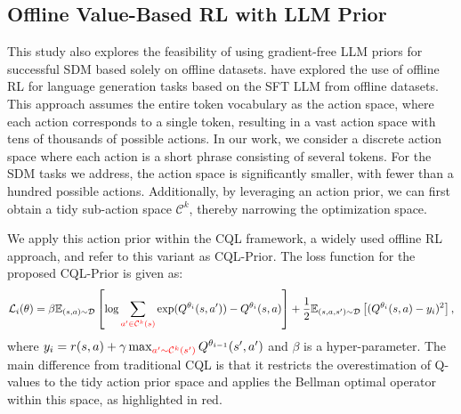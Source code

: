 \documentclass{article} %
\theoremstyle{plain}
\theoremstyle{definition}
\theoremstyle{remark}
\begin{document}
{\subsection{Offline Value-Based RL with LLM Prior}
\label{sec: offline_value_rl}

This study also explores the feasibility of using gradient-free LLM priors for successful SDM based solely on offline datasets.
\citep{snelloffline} have explored the use of offline RL for language generation tasks based on the SFT LLM from offline datasets. This approach assumes the entire token vocabulary as the action space, where each action corresponds to a single token, resulting in a vast action space with tens of thousands of possible actions. In our work, we consider a discrete action space where each action is a short phrase consisting of several tokens. For the SDM tasks we address, the action space is significantly smaller, with fewer than a hundred possible actions. Additionally, by leveraging an action prior, we can first obtain a tidy sub-action space $\mathcal{C}^k$, thereby narrowing the optimization space. 

We apply this action prior within the CQL framework, a widely used offline RL approach, and refer to this variant as CQL-Prior. The loss function for the proposed CQL-Prior is given as:
\begin{equation}
\label{cql_loss}
\mathcal{L}_i(\theta)=\beta\mathbb{E}_{(s,a)\sim \mathcal{D}}\left[\log \sum_{\textcolor{red}{a^\prime\in \mathcal{C}^k(s)}} \exp(Q^{\theta_i}(s,a^\prime))-Q^{\theta_i}(s,a)\right]+\frac{1}{2}\mathbb{E}_{(s,a,s^\prime)\sim \mathcal{D}} \left[(Q^{\theta_i}(s,a)-y_i)^2\right],
\end{equation}
where $y_i=r(s,a)+\gamma \max_{\textcolor{red}{a^\prime\sim \mathcal{C}^k(s^\prime)}} Q^{\theta_{i-1}}(s^\prime,a^\prime)$ and $\beta$ is a hyper-parameter. The main difference from traditional CQL is that it restricts the overestimation of Q-values to the tidy action prior space and applies the Bellman optimal operator within this space, as highlighted in red.
}
\end{document}
